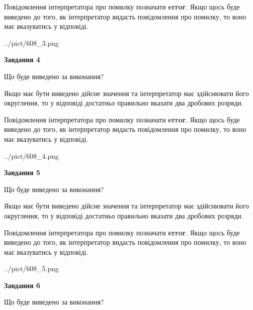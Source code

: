 \documentclass[12pt, ukrainian]{article}
\begin{document}
{\begin {Large}
Повідомлення інтерпретатора про помилку позначати \textbf{error}.
Якщо щось буде виведено до того, як інтерпретатор видасть повідомлення про помилку, 
то воно має вказуватись у відповіді. \par

\begin{center}
	{../pict/608_3.png}
\end{center}
\newpage

{\begin {center}\textbf{Завдання 4}\end {center}}\par
Що буде виведено за виконання? \par

Якщо має бути виведено дійсне значення та інтерпретатор має здійснювати його округлення, 
то у відповіді достатньо правильно вказати два дробових розряди.

Повідомлення інтерпретатора про помилку позначати \textbf{error}.
Якщо щось буде виведено до того, як інтерпретатор видасть повідомлення про помилку, 
то воно має вказуватись у відповіді. \par

\begin{center}
	{../pict/608_4.png}
\end{center}
\newpage

{\begin {center}\textbf{Завдання 5}\end {center}}\par
Що буде виведено за виконання? \par

Якщо має бути виведено дійсне значення та інтерпретатор має здійснювати його округлення, 
то у відповіді достатньо правильно вказати два дробових розряди.

Повідомлення інтерпретатора про помилку позначати \textbf{error}.
Якщо щось буде виведено до того, як інтерпретатор видасть повідомлення про помилку, 
то воно має вказуватись у відповіді. \par

\begin{center}
	{../pict/608_5.png}
\end{center}
\newpage

{\begin {center}\textbf{Завдання 6}\end {center}}\par
Що буде виведено за виконання? \par


\end{Large}}
\end{document}

